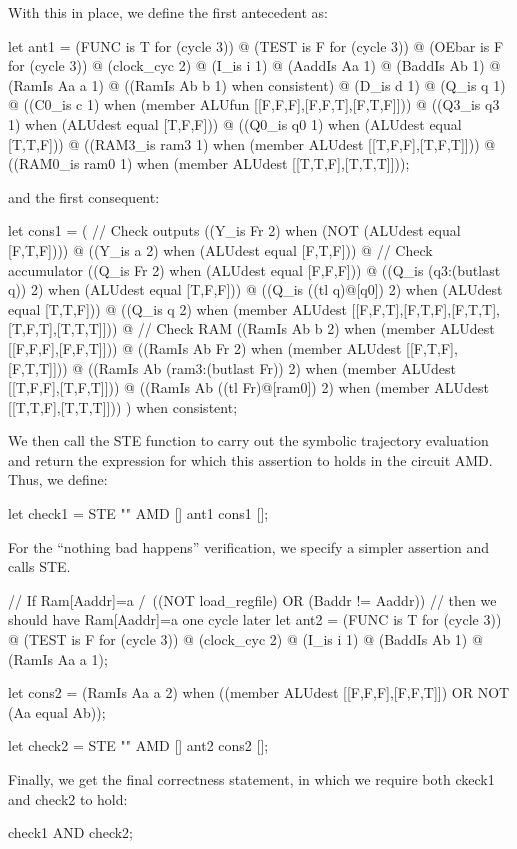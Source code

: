 With this in place, we define the first antecedent as:
\begin{hol}
let ant1 = (FUNC is T for (cycle 3)) @
           (TEST is F for (cycle 3)) @
           (OEbar is F for (cycle 3)) @
           (clock\_cyc 2) @
           (I\_is i 1) @
           (AaddIs Aa 1) @
           (BaddIs Ab 1) @
           (RamIs Aa a 1) @
           ((RamIs Ab b 1) when consistent) @
           (D\_is d 1) @
           (Q\_is q 1) @
           ((C0\_is c 1) when (member ALUfun [[F,F,F],[F,F,T],[F,T,F]])) @
           ((Q3\_is q3 1) when (ALUdest equal [T,F,F])) @
           ((Q0\_is q0 1) when (ALUdest equal [T,T,F])) @
           ((RAM3\_is ram3 1) when (member ALUdest [[T,F,F],[T,F,T]])) @
           ((RAM0\_is ram0 1) when (member ALUdest [[T,T,F],[T,T,T]]));
\end{hol}
and the first consequent:
\begin{hol}
let cons1 = (
             // Check outputs
             ((Y\_is Fr 2) when (NOT (ALUdest equal [F,T,F]))) @
             ((Y\_is a 2) when (ALUdest equal [F,T,F])) @
             // Check accumulator
             ((Q\_is Fr 2) when (ALUdest equal [F,F,F])) @
             ((Q\_is (q3:(butlast q)) 2) when (ALUdest equal [T,F,F])) @
             ((Q\_is ((tl q)@[q0]) 2) when (ALUdest equal [T,T,F])) @
             ((Q\_is q 2) when
                   (member ALUdest [[F,F,T],[F,T,F],[F,T,T],[T,F,T],[T,T,T]])) @
             // Check RAM
             ((RamIs Ab b 2) when (member ALUdest [[F,F,F],[F,F,T]])) @
             ((RamIs Ab Fr 2) when (member ALUdest [[F,T,F],[F,T,T]])) @
             ((RamIs Ab (ram3:(butlast Fr)) 2)
                            when (member ALUdest [[T,F,F],[T,F,T]])) @
             ((RamIs Ab ((tl Fr)@[ram0]) 2)
                            when (member ALUdest [[T,T,F],[T,T,T]]))
            ) when consistent;
\end{hol}

We then call the STE function to carry out the symbolic trajectory evaluation
and return the expression for which this assertion to holds in the
circuit AMD.
Thus, we define:
\begin{hol}
let check1 = STE "" AMD [] ant1 cons1 [];
\end{hol}

For the ``nothing bad happens'' verification, we specify a
simpler assertion and calls STE.
\begin{hol}
// If Ram[Aaddr]=a /\ ((NOT load\_regfile) OR (Baddr != Aaddr))
//   then we should have Ram[Aaddr]=a one cycle later
let ant2 = (FUNC is T for (cycle 3)) @
           (TEST is F for (cycle 3)) @
           (clock\_cyc 2) @
           (I\_is i 1) @
           (BaddIs Ab 1) @
           (RamIs Aa a 1);

let cons2 = (RamIs Aa a 2) when ((member ALUdest [[F,F,F],[F,F,T]]) OR
                                 NOT (Aa equal Ab));

let check2 = STE "" AMD [] ant2 cons2 [];
\end{hol}
 Finally, we get the final correctness statement, in which we require
both ckeck1 and check2 to hold:
\begin{hol}
check1 AND check2;
\end{hol}

